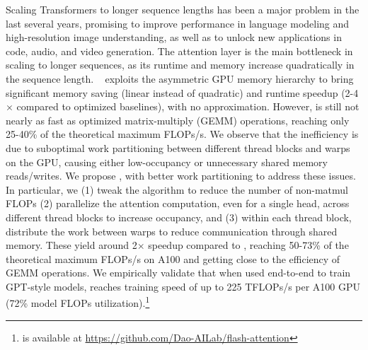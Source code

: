 Scaling Transformers to longer sequence lengths has been a major problem in the
last several years, promising to improve performance in language modeling and
high-resolution image understanding, as well as to unlock new applications in
code, audio, and video generation.
The attention layer is the main bottleneck in scaling to longer sequences, as
its runtime and memory increase quadratically in the sequence length.
\sysnameone~\citep{dao2022flashattention} exploits the asymmetric GPU memory
hierarchy to bring significant memory saving (linear instead of quadratic) and
runtime speedup (2-4$\times$ compared to optimized baselines), with no approximation.
However, \sysnameone is still not nearly as fast as optimized matrix-multiply
(GEMM) operations, reaching only 25-40\% of the theoretical maximum FLOPs/s.
We observe that the inefficiency is due to suboptimal work partitioning between
different thread blocks and warps on the GPU, causing either low-occupancy or
unnecessary shared memory reads/writes.
We propose \sysname, with better work partitioning to address these issues.
In particular, we (1) tweak the algorithm to reduce the number of non-matmul
FLOPs (2) parallelize the attention computation, even for a single head, across
different thread blocks to increase occupancy, and (3) within each thread block,
distribute the work between warps to reduce communication through shared memory.
These yield around 2$\times$ speedup compared to \sysnameone, reaching 50-73\% of the
theoretical maximum FLOPs/s on A100 and getting close to the efficiency of GEMM
operations.
We empirically validate that when used end-to-end to train GPT-style models,
\sysname reaches training speed of up to 225 TFLOPs/s per A100 GPU (72\% model
FLOPs utilization).\footnote{\sysname
  is available at \url{https://github.com/Dao-AILab/flash-attention}}

